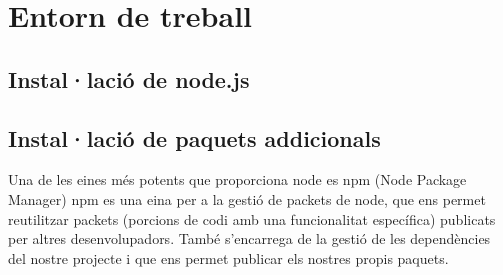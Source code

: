 \chapter{Entorn de treball}

\section{Instal·lació de node.js}


\section{Instal·lació de paquets addicionals}

Una de les eines més potents que proporciona node es npm (Node Package Manager)%
npm es una eina per a la gestió de packets de node, que ens permet reutilitzar packets (porcions de codi amb una funcionalitat específica) publicats per altres desenvolupadors. També s'encarrega de la gestió de les dependències del nostre projecte i que ens permet publicar els nostres propis paquets. 


